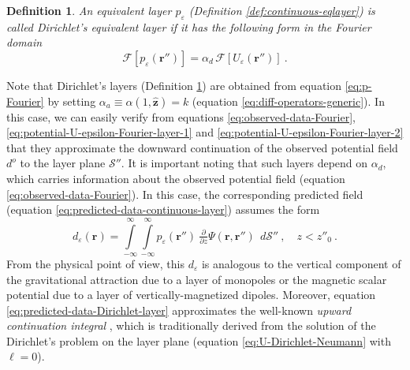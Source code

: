 \documentclass[manuscript,noblind]{geophysics}
\newtheorem{definition}{Definition}
\begin{document}
	\begin{definition}
		An equivalent layer $p_{\varepsilon}$ (Definition \ref{def:continuous-eqlayer}) is called Dirichlet's equivalent 
		layer if it has the following form in the Fourier domain
		\begin{equation}
			\mathcal{F} [ p_{\varepsilon}(\mathbf{r}'') ] =
			\alpha_{d} \, \mathcal{F} [ U_{\varepsilon}(\mathbf{r}'') ]  \: .
			\label{eq:p-Fourier-Dirichlet}
		\end{equation}
		\label{def:eql-Dirichlet}
	\end{definition}
	Note that Dirichlet's layers (Definition \ref{def:eql-Dirichlet}) are obtained from 
	equation \ref{eq:p-Fourier} by setting $\alpha_{a} \equiv \alpha(1, \hat{\mathbf{z}}) = k$ 
	(equation \ref{eq:diff-operators-generic}).
	In this case, we can easily verify from equations \ref{eq:observed-data-Fourier},
	\ref{eq:potential-U-epsilon-Fourier-layer-1} and \ref{eq:potential-U-epsilon-Fourier-layer-2} that they 
	approximate the downward continuation of the observed potential field $d^{o}$ to the layer plane $\mathcal{S}''$.
	It is important noting that such layers depend on $\alpha_{d}$, which 
	carries information about the observed potential field (equation \ref{eq:observed-data-Fourier}).
	In this case, the corresponding predicted field (equation \ref{eq:predicted-data-continuous-layer}) assumes the form
	\begin{equation}
		d_{\varepsilon}(\mathbf{r})
		= \int\limits_{-\infty}^{\infty}\int\limits_{-\infty}^{\infty}
		p_{\varepsilon}(\mathbf{r}'') \: \tfrac{\partial}{\partial z} \Psi(\mathbf{r}, \mathbf{r}'') \:\: d\mathcal{S}''
		\: , \quad z < z''_{0} \: .
		\label{eq:predicted-data-Dirichlet-layer}
	\end{equation}
	From the physical point of view, this $d_{\varepsilon}$ is analogous
	to the vertical component of the gravitational attraction due to a layer of monopoles
	or the magnetic scalar potential due to a layer of vertically-magnetized dipoles.
	Moreover, equation \ref{eq:predicted-data-Dirichlet-layer} approximates the well-known \textit{upward continuation integral} 
	\citep[e.g.,][]{skeels1947, peters1949, henderson-zietz1949, dean1958, roy1962, bhattacharyya1967, henderson1970},
	which is traditionally derived from the solution of the Dirichlet’s problem on the
	layer plane (equation \ref{eq:U-Dirichlet-Neumann} with $\ell = 0$). 
	
\end{document}
